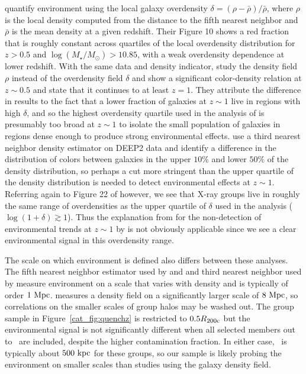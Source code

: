 \citet{Cucciati2010} quantify environment using the local galaxy
overdensity $\delta=(\rho-\bar{\rho})/\bar{\rho}$, where $\rho$ is the
local density computed from the distance to the fifth nearest neighbor
and $\bar{\rho}$ is the mean density at a given redshift. Their Figure
10 shows a red fraction that is roughly constant across quartiles
of the local overdensity distribution for $z>0.5$ and
$\log(M_{\star}/M_{\odot})>10.85$, with a weak overdensity dependence at lower
redshift. With the same data and density indicator, \citet{Peng2010}
study the density field $\rho$ 
instead of the overdensity field $\delta$ and show a
significant color-density relation at $z\sim0.5$ and state that it continues to at
least $z=1$. They attribute the
difference in results to the fact that a lower fraction of galaxies at
$z\sim1$ live in regions with high $\delta$, and so the highest overdensity
quartile used in the analysis of \citet{Cucciati2010} is presumably too
broad at $z\sim1$ to isolate the small population of galaxies in
regions dense enough to produce strong environmental
effects. \citet{Cooper2010} use a third nearest neighbor density
estimator on DEEP2 data and identify a difference in the
distribution of colors between galaxies in the upper $10\%$ and lower
$50\%$ of the density distribution, so perhaps a cut more stringent
than the upper quartile of the density distribution is needed to detect
environmental effects at $z\sim1$.  Referring again to Figure 22 of
\citet{Kovac2010a} however, we see that X-ray groups live in roughly
the same range of overdensities as the upper
quartile of $\delta$ used in the \citet{Cucciati2010} analysis
($\log(1+\delta)\gtrsim1$). Thus the explanation from \citet{Peng2010}
for the non-detection of environmental trends at $z\sim1$ by
\citet{Cucciati2010} is not obviously applicable since we see a clear
environmental signal in this overdensity range.

The scale on which environment is defined also differs between these
analyses. The fifth nearest neighbor estimator used by
\citet{Cucciati2010} and \citet{Peng2010} and third nearest neighbor
used by \citet{Cooper2010} measure environment on a
scale that varies with density and is typically of order
$1~\rm{Mpc}$. \citet{Scodeggio2009} measures a density field on a
significantly larger scale of $8~\rm{Mpc}$, so correlations on the
smaller scales of group halos may be washed out. The group sample in
Figure~\ref{cat_fig:quenchz} is restricted to $0.5\mbox{$R_{200\rm{c}}$}$ but the
environmental signal is not significantly different when all selected
members out to \rvir\ are included, despite the higher contamination
fraction. In either case, \rvir\ is typically about $500~\rm{kpc}$ for
these groups, so our sample is likely probing the environment on
smaller scales than studies using the galaxy density field.

